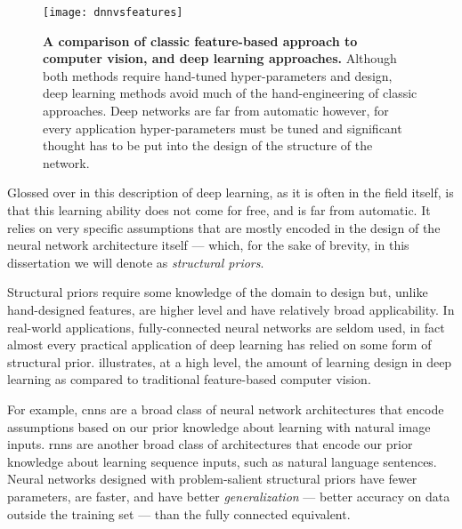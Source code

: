 \documentclass[thesis]{subfiles}
\begin{document}
\begin{figure}[tbp]
	\centering
	\texttt{[image: dnnvsfeatures]}
	\caption[Classic feature-based approach \vs{}deep learning]{\textbf{A comparison of classic feature-based approach to computer vision, and deep learning approaches.} Although both methods require hand-tuned hyper-parameters and design, deep learning methods avoid much of the hand-engineering of classic approaches. Deep networks are far from automatic however, for every application hyper-parameters must be tuned and significant thought has to be put into the design of the structure of the network.}\label{dnnvsfeatures}
\end{figure}
	
Glossed over in this description of deep learning, as it is often in the field itself, is that this learning ability does not come for free, and is far from automatic. It relies on very specific assumptions that are mostly encoded in the design of the neural network architecture itself --- which, for the sake of brevity, in this dissertation we will denote as \emph{structural priors}.

Structural priors require some knowledge of the domain to design but, unlike hand-designed features, are higher level and have relatively broad applicability. In real-world applications, fully-connected neural networks are seldom used, in fact almost every practical application of deep learning has relied on some form of structural prior.  illustrates, at a high level, the amount of learning \vs{}design in deep learning as compared to traditional feature-based computer vision.

For example, \glspl{cnn} are a broad class of neural network architectures that encode assumptions based on our prior knowledge about learning with natural image inputs. \Glspl{rnn} are another broad class of architectures that encode our prior knowledge about learning sequence inputs, such as natural language sentences. Neural networks designed with problem-salient structural priors have fewer parameters, are faster, and have better \emph{generalization} --- better accuracy on data outside the training set --- than the fully connected equivalent.
\end{document}
